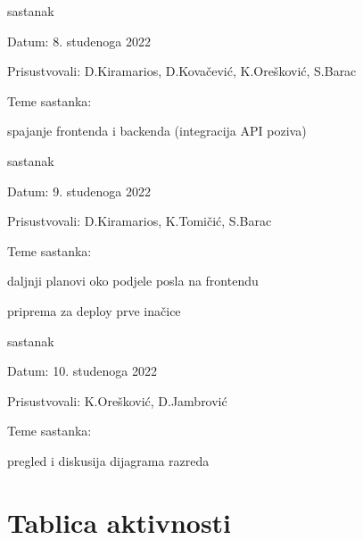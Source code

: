 \begin{packed_enum}
			\item  sastanak
			\item[] \begin{packed_item}
				\item Datum: 8. studenoga 2022
				\item Prisustvovali: D.Kiramarios, D.Kovačević, K.Orešković, S.Barac
				\item Teme sastanka:
				\begin{packed_item}
					\item spajanje frontenda i backenda (integracija API poziva)
				\end{packed_item}
			\end{packed_item}

			\item  sastanak
			\item[] \begin{packed_item}
				\item Datum: 9. studenoga 2022
				\item Prisustvovali: D.Kiramarios, K.Tomičić, S.Barac
				\item Teme sastanka:
				\begin{packed_item}
					\item daljnji planovi oko podjele posla na frontendu
					\item priprema za deploy prve inačice
				\end{packed_item}
			\end{packed_item}

			\item  sastanak
			\item[] \begin{packed_item}
				\item Datum: 10. studenoga 2022
				\item Prisustvovali: K.Orešković, D.Jambrović
				\item Teme sastanka:
				\begin{packed_item}
					\item pregled i diskusija dijagrama razreda
				\end{packed_item}
			\end{packed_item}
			
		\end{packed_enum}
		
		\eject
		\section*{Tablica aktivnosti}
		
